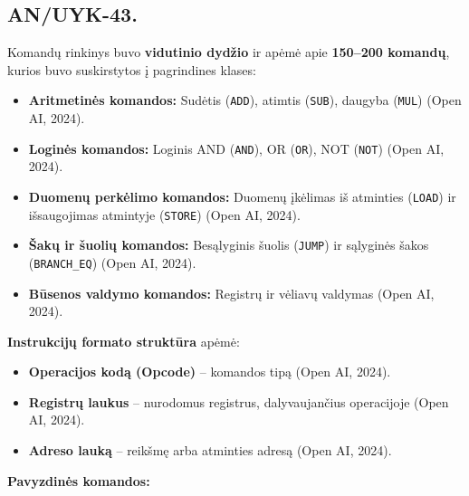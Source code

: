 \documentclass[a4paper,12pt]{article}
\begin{document}
\subsection{AN/UYK-43.}
Komandų rinkinys buvo \textbf{vidutinio dydžio} ir apėmė apie \textbf{150–200 komandų}, kurios buvo suskirstytos į pagrindines klases:
\begin{itemize}
    \item \textbf{Aritmetinės komandos:} Sudėtis (\texttt{ADD}), atimtis (\texttt{SUB}), daugyba (\texttt{MUL}) (Open AI, 2024).
    \item \textbf{Loginės komandos:} Loginis AND (\texttt{AND}), OR (\texttt{OR}), NOT (\texttt{NOT}) (Open AI, 2024).
    \item \textbf{Duomenų perkėlimo komandos:} Duomenų įkėlimas iš atminties (\texttt{LOAD}) ir išsaugojimas atmintyje (\texttt{STORE}) (Open AI, 2024).
    \item \textbf{Šakų ir šuolių komandos:} Besąlyginis šuolis (\texttt{JUMP}) ir sąlyginės šakos (\texttt{BRANCH\_EQ}) (Open AI, 2024).
    \item \textbf{Būsenos valdymo komandos:} Registrų ir vėliavų valdymas (Open AI, 2024).
\end{itemize}
\textbf{Instrukcijų formato struktūra} apėmė:
\begin{itemize}
    \item \textbf{Operacijos kodą (Opcode)} – komandos tipą (Open AI, 2024).
    \item \textbf{Registrų laukus} – nurodomus registrus, dalyvaujančius operacijoje (Open AI, 2024).
    \item \textbf{Adreso lauką} – reikšmę arba atminties adresą (Open AI, 2024).
\end{itemize}
\textbf{Pavyzdinės komandos:}
\end{document}

